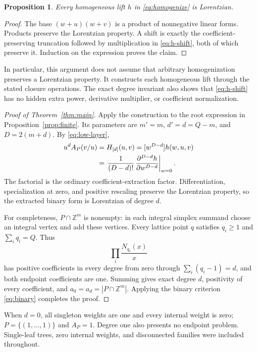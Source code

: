 \documentclass[11pt,letterpaper]{article}
\newtheorem{proposition}[theorem]{Proposition}
\theoremstyle{definition}
\theoremstyle{remark}
\newcommand{\ZZ}{\mathbb{Z}}
\begin{document}
\begin{proposition}\label{prop:lorentzian}
Every homogeneous lift $h$ in \eqref{eq:homogenize} is Lorentzian.
\end{proposition}
\begin{proof}
The base $(w+u)(w+v)$ is a product of nonnegative linear forms. Products preserve the Lorentzian property. A shift is exactly the coefficient-preserving truncation followed by multiplication in \eqref{eq:h-shift}, both of which preserve it. Induction on the expression proves the claim.
\end{proof}

In particular, this argument does not assume that arbitrary homogenization preserves a Lorentzian property. It constructs each homogeneous lift through the stated closure operations. The exact degree invariant also shows that \eqref{eq:h-shift} has no hidden extra power, derivative multiplier, or coefficient normalization.

\begin{proof}[Proof of Theorem~\ref{thm:main}]
Apply the construction to the root expression in Proposition~\ref{prop:finite}. Its parameters are $m'=m$, $d'=d=Q-m$, and $D=2(m+d)$. By \eqref{eq:low-layer},
\begin{align}\label{eq:extract}
 u^d A_P(v/u)
 &=H_{[d]}(u,v)=[w^{D-d}]h(w,u,v)\notag\\
 &=\left.\frac1{(D-d)!}\,
       \frac{\partial^{D-d}h}{\partial w^{D-d}}\right|_{w=0}.
\end{align}
The factorial is the ordinary coefficient-extraction factor. Differentiation, specialization at zero, and positive rescaling preserve the Lorentzian property, so the extracted binary form is Lorentzian of degree $d$.

For completeness, $P\cap\ZZ^m$ is nonempty: in each integral simplex summand choose an integral vertex and add these vertices. Every lattice point $q$ satisfies $q_i\geq1$ and $\sum_iq_i=Q$. Thus
\[
 \prod_i\frac{N_{q_i}(x)}x
\]
has positive coefficients in every degree from zero through $\sum_i(q_i-1)=d$, and both endpoint coefficients are one. Summing gives exact degree $d$, positivity of every coefficient, and $a_0=a_d=|P\cap\ZZ^m|$. Applying the binary criterion \eqref{eq:binary} completes the proof.
\end{proof}

When $d=0$, all singleton weights are one and every internal weight is zero; $P=\{(1,\ldots,1)\}$ and $A_P=1$. Degree one also presents no endpoint problem. Single-leaf trees, zero internal weights, and disconnected families were included throughout.
\end{document}
